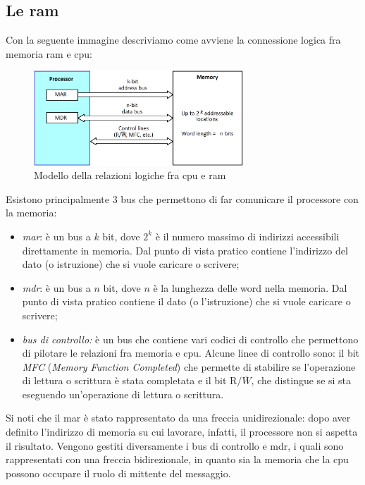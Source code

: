 \documentclass[class=book, crop=false, oneside]{standalone}
\begin{document}
\subsection{Le \acrshort{ram}}
Con la seguente immagine descriviamo come avviene la connessione logica fra memoria \acrshort{ram} e \acrshort{cpu}:
\begin{figure}[H]
	\centering
	\includegraphics[width=0.7\textwidth,keepaspectratio]{relazione_cpu_ram.png}
	\caption{Modello della relazioni logiche fra \acrshort{cpu} e \acrshort{ram}}
\end{figure}
Esistono principalmente 3 bus che permettono di far comunicare il processore con la memoria:
\begin{itemize}
	\item \emph{\acrfull{mar}}: è un bus a \(k\) bit, dove \(2^k\) è il numero massimo di indirizzi accessibili direttamente in memoria. Dal punto di vista pratico contiene l'indirizzo del dato (o istruzione) che si vuole caricare o scrivere;
	\item \emph{\acrfull{mdr}}: è un bus a \(n\) bit, dove \(n\) è la lunghezza delle word nella memoria. Dal punto di vista pratico contiene il dato (o l'istruzione) che si vuole caricare o scrivere;
	\item \emph{bus di controllo:} è un bus che contiene vari codici di controllo che permettono di pilotare le relazioni fra memoria e \acrshort{cpu}. Alcune linee di controllo sono: il bit \emph{MFC} (\emph{Memory Function Completed}) che permette di stabilire se l'operazione di lettura o scrittura è stata completata e il bit \emph{\(\textrm{R/}\overline{W}\)}, che distingue se si sta eseguendo un'operazione di lettura o scrittura.
\end{itemize}
Si noti che il \acrshort{mar} è stato rappresentato da una freccia unidirezionale: dopo aver definito l'indirizzo di memoria su cui lavorare, infatti, il processore non si aspetta il risultato. Vengono gestiti diversamente i bus di controllo e \acrshort{mdr}, i quali sono rappresentati con una freccia bidirezionale, in quanto sia la memoria che la \acrshort{cpu} possono occupare il ruolo di mittente del messaggio.
\end{document}

